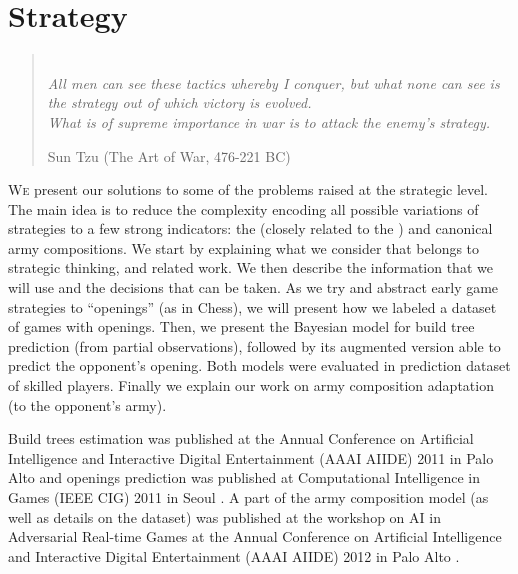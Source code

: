 \chapter{Strategy}
\label{chapter:strategy}
\begin{quotation}
\\
\textit{All men can see these tactics whereby I conquer, but what none can see is the strategy out of which victory is evolved.}\\
\textit{What is of supreme importance in war is to attack the enemy's strategy.}\\
\begin{flushright}Sun Tzu (The Art of War, 476-221 BC)\end{flushright}
\end{quotation}


\lettrine{W}e present our solutions to some of the problems raised at the strategic level. The main idea is to reduce the complexity encoding all possible variations of strategies to a few strong indicators: the  (closely related to the ) and canonical army compositions. 
We start by explaining what we consider that belongs to strategic thinking, and related work. We then describe the information that we will use and the decisions that can be taken. As we try and abstract early game strategies to ``openings'' (as in Chess), we will present how we labeled a dataset of games with openings. Then, we present the Bayesian model for build tree prediction (from partial observations), followed by its augmented version able to predict the opponent's opening. Both models were evaluated in prediction dataset of skilled players. Finally we explain our work on army composition adaptation (to the opponent's army).

Build trees estimation was published at the Annual Conference on Artificial Intelligence and Interactive Digital Entertainment (AAAI AIIDE) 2011 in Palo Alto \citep{SYNNAEVE:StratPred} and openings prediction was published at Computational Intelligence in Games (IEEE CIG) 2011 in Seoul \citep{SYNNAEVE:OpeningPred}. A part of the army composition model (as well as details on the dataset) was published at the workshop on AI in Adversarial Real-time Games at the Annual Conference on Artificial Intelligence and Interactive Digital Entertainment (AAAI AIIDE) 2012 in Palo Alto \citep{SYNNAEVE:Dataset}.

